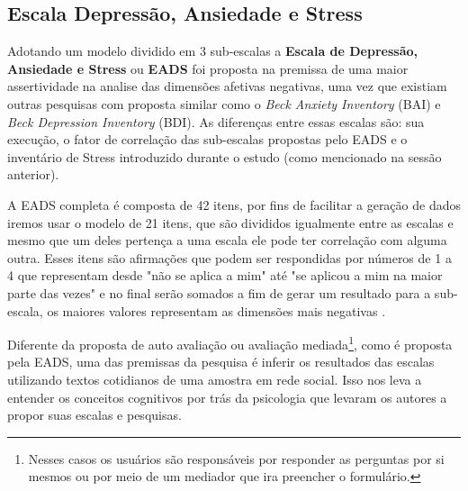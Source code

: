 \subsection{Escala Depressão, Ansiedade e Stress}
Adotando um modelo dividido em 3 sub-escalas a \textbf{Escala de Depressão, Ansiedade e Stress} ou \textbf{EADS} foi proposta na premissa de uma maior assertividade na analise das dimensões afetivas negativas, uma vez que existiam outras pesquisas com proposta similar como o \textit{ Beck Anxiety Inventory} (BAI) e \textit{Beck Depression Inventory} (BDI). As diferenças entre essas escalas são: sua execução, o fator de correlação das sub-escalas propostas pelo EADS e o inventário de Stress introduzido durante o estudo (como mencionado na sessão anterior).  

A EADS completa é composta de 42 itens, por fins de facilitar a geração de dados iremos usar o modelo de 21 itens, que são divididos igualmente entre as escalas e mesmo que um deles pertença a uma escala ele pode ter correlação com alguma outra. Esses itens são afirmações que podem ser respondidas por números de 1 a 4 que representam desde "não se aplica a mim" até "se aplicou a mim na maior parte das vezes" e no final serão somados a fim de gerar um resultado para a sub-escala, os maiores valores representam as dimensões mais negativas \cite{lovibond1995structure, ribeiro2004contribuiccao}.

Diferente da proposta de auto avaliação ou avaliação mediada\footnote{Nesses casos os usuários são responsáveis por responder as perguntas por si mesmos ou por meio de um mediador que ira preencher o formulário.}, como é proposta pela EADS,  uma das premissas da pesquisa é inferir os resultados das escalas utilizando textos cotidianos de uma amostra em rede social. Isso nos leva a entender os conceitos cognitivos por trás da psicologia que levaram os autores a propor suas escalas e pesquisas.


